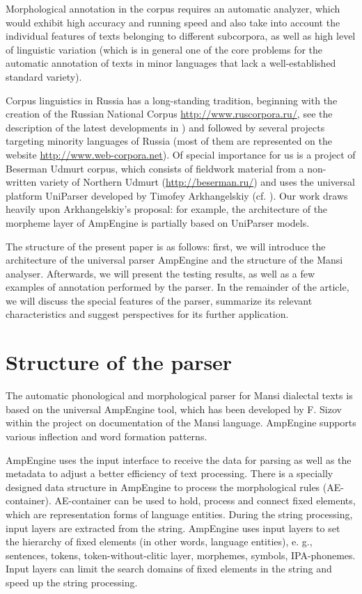\documentclass[b5paper,notitlepage]{article}
\begin{document}
Morphological annotation in the corpus requires an automatic analyzer, which would exhibit high accuracy and running speed and also take into account the individual features of texts belonging to different subcorpora, as well as high level of linguistic variation (which is in general one of the core problems for the automatic annotation of texts in minor languages that lack a well-established standard variety).

Corpus linguistics in Russia has a long-standing tradition, beginning with the creation of the Russian National Corpus \url{http://www.ruscorpora.ru/}, see the description of the latest developments in \cite{Plungian 2009}) and followed by several projects targeting minority languages of Russia (most of them are represented on the website \url{http://www.web-corpora.net}). Of special importance for us is a project of Beserman Udmurt corpus, which consists of fieldwork material from a non-written variety of Northern Udmurt (\url{http://beserman.ru/}) and uses the universal platform UniParser developed by Timofey Arkhangelskiy (cf. \cite{timofei}). Our work draws heavily upon Arkhangelskiy’s proposal: for example, the architecture of the morpheme layer of AmpEngine is partially based on UniParser models. 

The structure of the present paper is as follows: first, we will introduce the architecture of the universal parser AmpEngine and the structure of the Mansi analyser. Afterwards, we will present the testing results, as well as a few examples of annotation performed by the parser. In the remainder of the article, we will discuss the special features of the parser, summarize its relevant characteristics and suggest perspectives for its further application. 



\section{Structure of the parser}

The automatic phonological and morphological parser for Mansi dialectal texts is based on the universal AmpEngine tool, which has been developed by F. Sizov within the project on documentation of the Mansi language. AmpEngine supports various inflection and word formation patterns.

AmpEngine uses the input interface to receive the data for parsing as well as the metadata to adjust a better efficiency of text processing. There is a specially designed data structure in AmpEngine to process the morphological rules (AE-container). AE-container can be used to hold, process and connect fixed elements, which are representation forms of language entities.
During the string processing, input layers are extracted from the string. AmpEngine uses input layers to set the hierarchy of fixed elements (in other words, language entities), e. g., sentences, tokens, token-without-clitic layer, morphemes, symbols, IPA-phonemes. Input layers can limit the search domains of fixed elements in the string and speed up the string processing.
\end{document}
